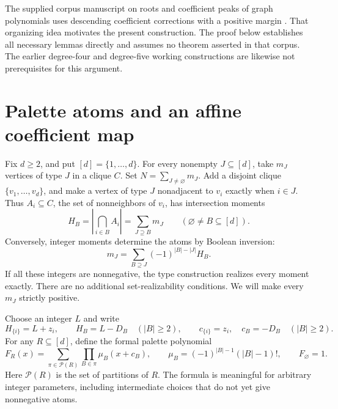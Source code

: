 \documentclass[11pt,a4paper]{article}
\theoremstyle{definition}
\newcommand{\calP}{\mathcal P}
\begin{document}
The supplied corpus manuscript on roots and coefficient peaks of graph
polynomials uses descending coefficient corrections with a positive
margin \cite[Sections 2--3]{VMRC}. That organizing idea motivates the
present construction. The proof below establishes all necessary lemmas
directly and assumes no theorem asserted in that corpus. The earlier
degree-four and degree-five working constructions are likewise not
prerequisites for this argument.

\section{Palette atoms and an affine coefficient map}\label{sec:palettes}

Fix $d\ge2$, and put $[d]=\{1,\ldots,d\}$. For every nonempty
$J\subseteq[d]$, take $m_J$ vertices of type $J$ in a clique $C$.
Set $N=\sum_{J\ne\varnothing}m_J$. Add a disjoint clique
$\{v_1,\ldots,v_d\}$, and make a vertex of type $J$ nonadjacent to
$v_i$ exactly when $i\in J$. Thus $A_i\subseteq C$, the set of
nonneighbors of $v_i$, has intersection moments
\begin{equation}\label{eq:moments}
 H_B=\left|\bigcap_{i\in B}A_i\right|
     =\sum_{J\supseteq B}m_J\qquad(\varnothing\ne B\subseteq[d]).
\end{equation}
Conversely, integer moments determine the atoms by Boolean inversion:
\begin{equation}\label{eq:inversion}
 m_J=\sum_{B\supseteq J}(-1)^{|B|-|J|}H_B.
\end{equation}
If all these integers are nonnegative, the type construction realizes
every moment exactly. There are no additional set-realizability
conditions. We will make every $m_J$ strictly positive.

Choose an integer $L$ and write
\begin{equation}\label{eq:parameters}
 H_{\{i\}}=L+z_i,\qquad H_B=L-D_B\quad(|B|\ge2),
 \qquad c_{\{i\}}=z_i,\quad c_B=-D_B\quad(|B|\ge2).
\end{equation}
For any $R\subseteq[d]$, define the formal palette polynomial
\begin{equation}\label{eq:palette}
 F_R(x)=\sum_{\pi\in\calP(R)}\prod_{B\in\pi}
       \mu_B(x+c_B),\qquad
 \mu_B=(-1)^{|B|-1}(|B|-1)!,\qquad F_\varnothing=1.
\end{equation}
Here $\calP(R)$ is the set of partitions of $R$. The formula is meaningful
for arbitrary integer parameters, including intermediate choices that
do not yet give nonnegative atoms.
\end{document}

